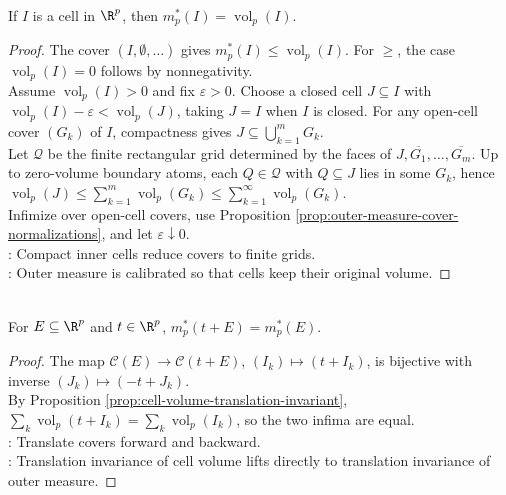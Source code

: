 \begin{theorem} \label{thm:outer-measure-agrees-with-cell-volume} \\
If $I$ is a cell in $\R^p$, then $m_p^\ast(I)=\operatorname{vol}_p(I)$.
\begin{proof}
The cover $(I,\emptyset,\ldots)$ gives $m_p^\ast(I)\leq\operatorname{vol}_p(I)$. For $\geq$, the case $\operatorname{vol}_p(I)=0$ follows by nonnegativity.\\
Assume $\operatorname{vol}_p(I)>0$ and fix $\varepsilon>0$. Choose a closed cell $J\subseteq I$ with $\operatorname{vol}_p(I)-\varepsilon<\operatorname{vol}_p(J)$, taking $J=I$ when $I$ is closed. For any open-cell cover $(G_k)$ of $I$, compactness gives $J\subseteq\bigcup_{k=1}^{m}G_k$.\\
Let $\mathcal{Q}$ be the finite rectangular grid determined by the faces of $J,\overline{G_1},\ldots,\overline{G_m}$. Up to zero-volume boundary atoms, each $Q\in\mathcal{Q}$ with $Q\subseteq J$ lies in some $G_k$, hence $\operatorname{vol}_p(J)\leq\sum_{k=1}^{m}\operatorname{vol}_p(G_k)\leq\sum_{k=1}^{\infty}\operatorname{vol}_p(G_k)$.\\
Infimize over open-cell covers, use Proposition \ref{prop:outer-measure-cover-normalizations}, and let $\varepsilon\downarrow0$.\\
: Compact inner cells reduce covers to finite grids.\\
: Outer measure is calibrated so that cells keep their original volume.
\end{proof}
\end{theorem}

\begin{theorem} \label{thm:outer-measure-translation-invariance} \\
For $E\subseteq\R^p$ and $t\in\R^p$, $m_p^\ast(t+E)=m_p^\ast(E)$.
\begin{proof} The map $\mathcal{C}(E)\to\mathcal{C}(t+E)$, $(I_k)\mapsto(t+I_k)$, is bijective with inverse $(J_k)\mapsto(-t+J_k)$.\\
By Proposition \ref{prop:cell-volume-translation-invariant}, $\sum_k\operatorname{vol}_p(t+I_k)=\sum_k\operatorname{vol}_p(I_k)$, so the two infima are equal.\\
: Translate covers forward and backward.\\
: Translation invariance of cell volume lifts directly to translation invariance of outer measure.
\end{proof}
\end{theorem}

